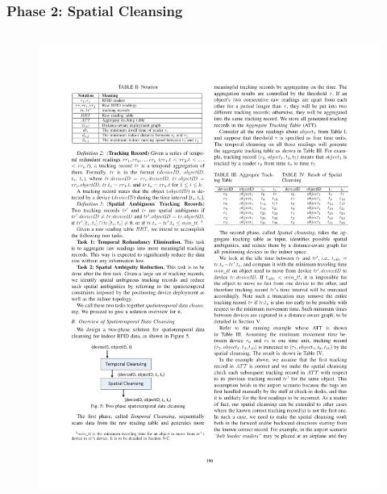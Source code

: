 
\begin{frame}
\frametitle{Phase 2: Spatial Cleansing}

\begin{columns}[c]

  \begin{figure}[tb]
    \includegraphics[width=\columnwidth]{figures/3-2/3-2-5.pdf}
  \end{figure}


\end{columns}
\end{frame}

